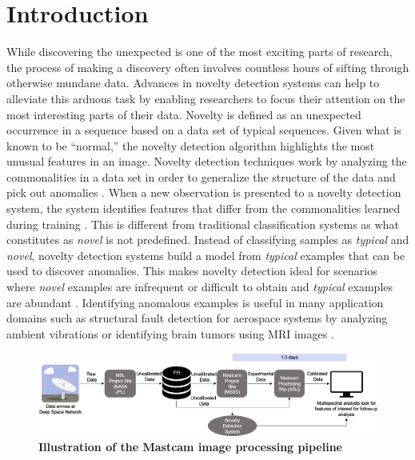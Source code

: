 \section{Introduction}
While discovering the unexpected is one of the most exciting parts of research, the process of making a discovery often involves countless hours of sifting through otherwise mundane data. 
Advances in novelty detection systems can help to alleviate this arduous task by enabling researchers to focus their attention on the most interesting parts of their data. 
Novelty is defined as an unexpected occurrence in a sequence based on a data set of typical sequences.
Given what is known to be “normal,” the novelty detection algorithm highlights the most unusual features in an image. 
Novelty detection techniques work by analyzing the commonalities in a data set in order to generalize the structure of the data and pick out anomalies \cite{japkowicz1995novelty}.
When a new observation is presented to a novelty detection system, the system identifies features that differ from the commonalities learned during training \cite{markou2003novelty}.
This is different from traditional classification systems as what constitutes as \textit{novel} is not predefined. 
Instead of classifying samples as \textit{typical} and \textit{novel}, novelty detection systems build a model from \textit{typical} examples that can be used to discover anomalies. 
This makes novelty detection ideal for scenarios where \textit{novel} examples are infrequent or difficult to obtain and \textit{typical} examples are abundant \cite{japkowicz1995novelty}.
Identifying anomalous examples is useful in many application domains such as structural fault detection for aerospace systems by analyzing ambient vibrations \cite{worden1997structural} or identifying brain tumors using MRI images \cite{wang2020brain}.
\begin{figure}
\centering
\includegraphics[width=\linewidth]{figs/1/DSN.png}
\caption[Mastcam Image Processing Pipeline]{\textbf{Illustration of the Mastcam image processing pipeline \protect\cite{kerner2020comparison}}}
\label{chap1/fig:timeline}
\end{figure}

